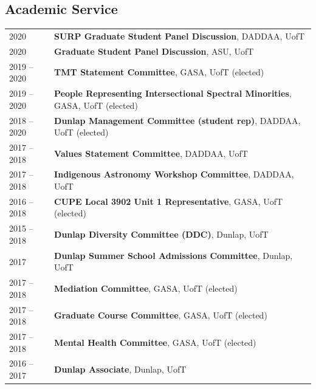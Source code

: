 \documentclass[10pt]{res} %
\begin{document}
\begin{resume}

\newpage
\section{\Large Academic Service}
\vspace{-5pt} %
\noindent\makebox[\linewidth]{\rule{\textwidth}{0.4pt}}
\vspace{-20pt} %

\begin{table}[h!]
\begin{tabularx}{\textwidth}{lX}
2020 & \textbf{SURP Graduate Student Panel Discussion}, DADDAA, UofT \\
2020 & \textbf{Graduate Student Panel Discussion}, ASU, UofT \\
2019 -- 2020 & \textbf{TMT Statement Committee}, GASA, UofT (elected) \\
2019 -- 2020 & \textbf{People Representing Intersectional Spectral Minorities}, GASA, UofT (elected) \\
2018 -- 2020 & \textbf{Dunlap Management Committee (student rep)}, DADDAA, UofT (elected) \\
2017 -- 2018 & \textbf{Values Statement Committee}, DADDAA, UofT \\
2017 -- 2018 & \textbf{Indigenous Astronomy  Workshop Committee}, DADDAA, UofT \\
2016 --  2018 & \textbf{CUPE Local 3902 Unit 1 Representative}, GASA, UofT (elected) \\
2015 --  2018 & \textbf{Dunlap Diversity Committee (DDC)}, Dunlap, UofT \\
2017 & \textbf{Dunlap Summer School Admissions Committee}, Dunlap, UofT \\
2017 -- 2018 & \textbf{Mediation Committee}, GASA, UofT (elected) \\
2017 -- 2018 & \textbf{Graduate Course Committee}, GASA, UofT (elected) \\
2017 -- 2018 & \textbf{Mental Health Committee}, GASA, UofT (elected) \\
2016 --  2017 & \textbf{Dunlap Associate}, Dunlap, UofT
\end{tabularx}
\end{table}


\end{resume}
\end{document}
